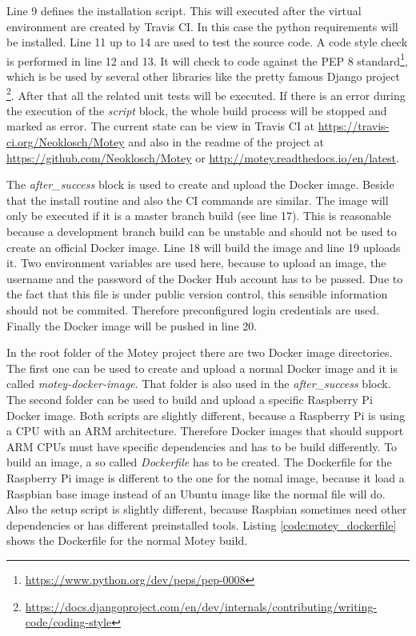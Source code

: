 Line 9 defines the installation script.
This will executed after the virtual environment are created by Travis CI.
In this case the python requirements will be installed.
Line 11 up to 14 are used to test the source code.
A code style check is performed in line 12 and 13.
It will check to code against the \ac{PEP} 8 standard\footnote{\url{https://www.python.org/dev/peps/pep-0008}}, which is be used by several other libraries like the pretty famous Django project{ \footnote{\url{https://docs.djangoproject.com/en/dev/internals/contributing/writing-code/coding-style}}}.
After that all the related unit tests will be executed.
If there is an error during the execution of the \textit{script} block, the whole build process will be stopped and marked as error.
The current state can be view in Travis CI at \url{https://travis-ci.org/Neoklosch/Motey} and also in the readme of the project at \url{https://github.com/Neoklosch/Motey} or \url{http://motey.readthedocs.io/en/latest}.\newline

The \textit{after\_success} block is used to create and upload the Docker image.
Beside that the install routine and also the \ac{CI} commands are similar.
The image will only be executed if it is a master branch build (see line 17).
This is reasonable because a development branch build can be unstable and should not be used to create an official Docker image.
Line 18 will build the image and line 19 uploads it.
Two environment variables are used here, because to upload an image, the username and the password of the Docker Hub account has to be passed.
Due to the fact that this file is under public version control, this sensible information should not be commited.
Therefore preconfigured login credentials are used.
Finally the Docker image will be pushed in line 20.\newline

In the root folder of the Motey project there are two Docker image directories.
The first one can be used to create and upload a normal Docker image and it is called \textit{motey-docker-image}.
That folder is also used in the \textit{after\_success} block.
The second folder can be used to build and upload a specific Raspberry Pi Docker image.
Both scripts are slightly different, because a Raspberry Pi is using a \ac{CPU} with an ARM architecture.
Therefore Docker images that should support ARM \acp{CPU} must have specific dependencies and has to be build differently.
To build an image, a so called \textit{Dockerfile} has to be created.
The Dockerfile for the Raspberry Pi image is different to the one for the nomal image, because it load a Raspbian base image instead of an Ubuntu image like the normal file will do.
Also the setup script is slightly different, because Raspbian sometimes need other dependencies or has different preinstalled tools.
Listing \ref{code:motey_dockerfile} shows the Dockerfile for the normal Motey build.

